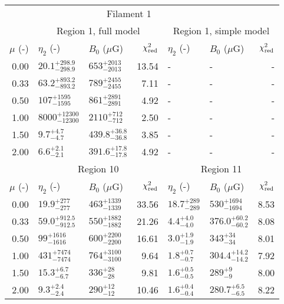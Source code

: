 \begin{tabular}{@{}rllrllr@{}}

\toprule
\multicolumn{6}{c}{Filament 1} \\
\cmidrule{1-7}
{} & \multicolumn{3}{c}{Region 1, full model\tablenotemark{a}}
   & \multicolumn{3}{c}{Region 1, simple model} \\
\cmidrule(lr){2-4} \cmidrule(l){5-7}
$\mu$ (-) & $\eta_2$ (-) & $B_0$ ($\mu$G) & $\chi^2_{\mathrm{red}}$
          & $\eta_2$ (-) & $B_0$ ($\mu$G) & $\chi^2_{\mathrm{red}}$ \\
\cmidrule{1-7}
0.00 & ${20.1}^{+298.9}_{-298.9}$ & ${653}^{+2013}_{-2013}$ & 13.54
     & - & - & - \\
0.33 & ${63.2}^{+893.2}_{-893.2}$ & ${789}^{+2455}_{-2455}$ & 7.11
     & - & - & - \\
0.50 & ${107}^{+1595}_{-1595}$ & ${861}^{+2891}_{-2891}$ & 4.92
     & - & - & - \\
1.00 & ${8000}^{+12300}_{-12300}$ & ${2110}^{+712}_{-712}$ & 2.50
     & - & - & - \\
1.50 & ${9.7}^{+4.7}_{-4.7}$ & ${439.8}^{+36.8}_{-36.8}$ & 3.85
     & - & - & - \\
2.00 & ${6.6}^{+2.1}_{-2.1}$ & ${391.6}^{+17.8}_{-17.8}$ & 4.92
     & - & - & - \\

\cmidrule{1-7}
{} & \multicolumn{3}{c}{Region 10}
   & \multicolumn{3}{c}{Region 11} \\
\cmidrule(lr){2-4} \cmidrule(l){5-7}
$\mu$ (-) & $\eta_2$ (-) & $B_0$ ($\mu$G) & $\chi^2_{\mathrm{red}}$
          & $\eta_2$ (-) & $B_0$ ($\mu$G) & $\chi^2_{\mathrm{red}}$ \\
\cmidrule{1-7}
0.00 & ${19.9}^{+277}_{-277}$ & ${463}^{+1339}_{-1339}$ & 33.56
     & ${18.7}^{+289}_{-289}$ & ${530}^{+1694}_{-1694}$ & 8.53 \\
0.33 & ${59.0}^{+912.5}_{-912.5}$ & ${550}^{+1882}_{-1882}$ & 21.26
     & ${4.4}^{+4.0}_{-4.0}$ & ${376.0}^{+60.2}_{-60.2}$ & 8.08 \\
0.50 & ${99}^{+1616}_{-1616}$ & ${600}^{+2200}_{-2200}$ & 16.61
     & ${3.0}^{+1.9}_{-1.9}$ & ${343}^{+34}_{-34}$ & 8.01 \\
1.00 & ${431}^{+7474}_{-7474}$ & ${764}^{+3100}_{-3100}$ & 9.64
     & ${1.8}^{+0.7}_{-0.7}$ & ${304.4}^{+14.2}_{-14.2}$ & 7.92 \\
1.50 & ${15.3}^{+6.7}_{-6.7}$ & ${336}^{+28}_{-28}$ & 9.81
     & ${1.6}^{+0.5}_{-0.5}$ & ${289}^{+9}_{-9}$ & 8.00 \\
2.00 & ${9.3}^{+2.4}_{-2.4}$ & ${290}^{+12}_{-12}$ & 10.46
     & ${1.6}^{+0.4}_{-0.4}$ & ${280.7}^{+6.5}_{-6.5}$ & 8.22 \\


\end{tabular}
